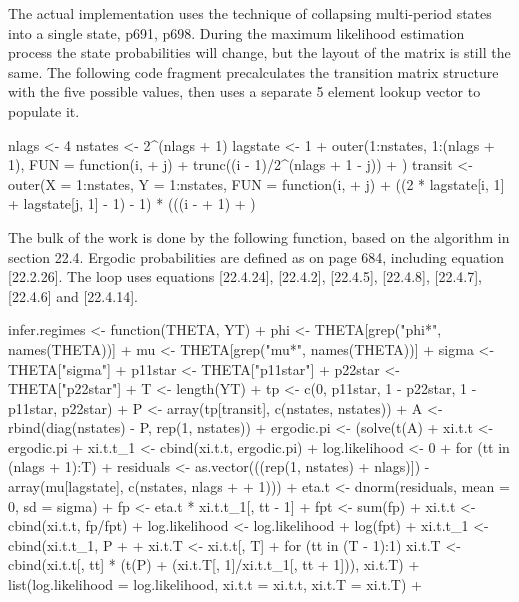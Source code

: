 \documentclass[a4paper]{article}
\begin{document}
The actual implementation uses the technique of collapsing multi-period states into a single state, p691, p698.
During the maximum likelihood estimation process the state probabilities will change, but the layout of the matrix
is still the same.  The following code fragment precalculates the transition matrix structure with the five possible
values, then uses a separate 5 element lookup vector to populate it.
\begin{Schunk}
\begin{Sinput}
 nlags <- 4
 nstates <- 2^(nlags + 1)
 lagstate <- 1 + outer(1:nstates, 1:(nlags + 1), FUN = function(i, 
+     j) {
+     trunc((i - 1)/2^(nlags + 1 - j))%
+ })
 transit <- outer(X = 1:nstates, Y = 1:nstates, FUN = function(i, 
+     j) {
+     ((2 * lagstate[i, 1] + lagstate[j, 1] - 1) - 1) * (((i - 
+         1)%
+ })
\end{Sinput}
\end{Schunk}
The bulk of the work is done by the following function, based on the algorithm in section 22.4.
Ergodic probabilities are defined as on page 684, including equation [22.2.26].
The loop uses equations [22.4.24], [22.4.2], [22.4.5], [22.4.8], [22.4.7], [22.4.6] and [22.4.14].
\begin{Schunk}
\begin{Sinput}
 infer.regimes <- function(THETA, YT) {
+     phi <- THETA[grep("phi*", names(THETA))]
+     mu <- THETA[grep("mu*", names(THETA))]
+     sigma <- THETA["sigma"]
+     p11star <- THETA["p11star"]
+     p22star <- THETA["p22star"]
+     T <- length(YT)
+     tp <- c(0, p11star, 1 - p22star, 1 - p11star, p22star)
+     P <- array(tp[transit], c(nstates, nstates))
+     A <- rbind(diag(nstates) - P, rep(1, nstates))
+     ergodic.pi <- (solve(t(A) %
+     xi.t.t <- ergodic.pi %
+     xi.t.t_1 <- cbind(xi.t.t, ergodic.pi)
+     log.likelihood <- 0
+     for (tt in (nlags + 1):T) {
+         residuals <- as.vector(((rep(1, nstates) %
+             nlags)]) - array(mu[lagstate], c(nstates, nlags + 
+             1))) %
+         eta.t <- dnorm(residuals, mean = 0, sd = sigma)
+         fp <- eta.t * xi.t.t_1[, tt - 1]
+         fpt <- sum(fp)
+         xi.t.t <- cbind(xi.t.t, fp/fpt)
+         log.likelihood <- log.likelihood + log(fpt)
+         xi.t.t_1 <- cbind(xi.t.t_1, P %
+     }
+     xi.t.T <- xi.t.t[, T] %
+     for (tt in (T - 1):1) xi.t.T <- cbind(xi.t.t[, tt] * (t(P) %
+         (xi.t.T[, 1]/xi.t.t_1[, tt + 1])), xi.t.T)
+     list(log.likelihood = log.likelihood, xi.t.t = xi.t.t, xi.t.T = xi.t.T)
+ }
\end{Sinput}
\end{Schunk}
\end{document}
